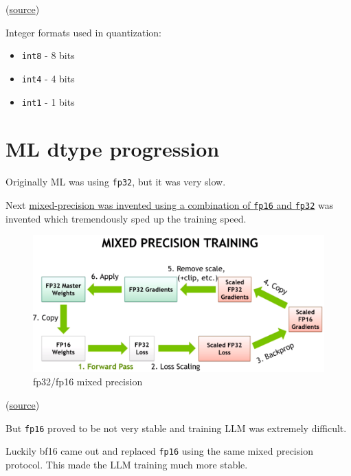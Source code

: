 \documentclass[
]{report}
\providecommand{\tightlist}{%
  \setlength{\itemsep}{0pt}\setlength{\parskip}{0pt}}\usepackage{longtable,booktabs,array}
\begin{document}
(\href{https://docs.nvidia.com/deeplearning/transformer-engine/user-guide/examples/fp8_primer.html}{source})

Integer formats used in quantization:

\begin{itemize}
\tightlist
\item
  \texttt{int8} - 8 bits
\item
  \texttt{int4} - 4 bits
\item
  \texttt{int1} - 1 bits
\end{itemize}

\section{ML dtype progression}\label{ml-dtype-progression}

Originally ML was using \texttt{fp32}, but it was very slow.

Next
\href{https://developer.nvidia.com/blog/video-mixed-precision-techniques-tensor-cores-deep-learning/}{mixed-precision
was invented using a combination of \texttt{fp16} and \texttt{fp32}} was
invented which tremendously sped up the training speed.

\begin{figure}[H]

{\centering \includegraphics{images/mixed-precision-fp16.png}

}

\caption{fp32/fp16 mixed precision}

\end{figure}%

(\href{https://developer.nvidia.com/blog/video-mixed-precision-techniques-tensor-cores-deep-learning/}{source})

But \texttt{fp16} proved to be not very stable and training LLM was
extremely difficult.

Luckily bf16 came out and replaced \texttt{fp16} using the same mixed
precision protocol. This made the LLM training much more stable.
\end{document}
